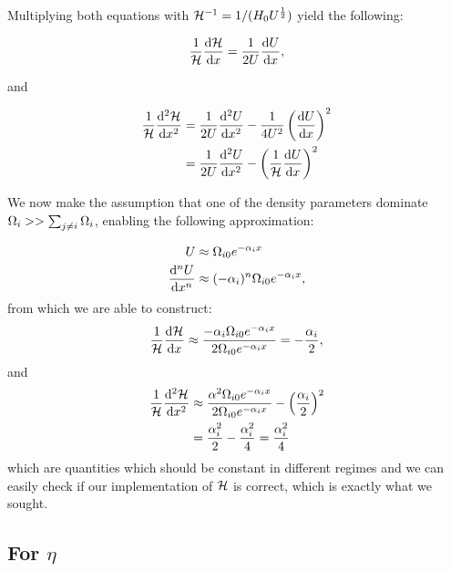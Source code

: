     Multiplying both equations with $\mathcal{H}^{-1} = 1/(H_0U^{\frac{1}{2}})$ yield the following:

    \begin{equation}
        \frac{1}{\mathcal{H}}\dv{\mathcal{H}}{x} = \frac{1}{2U}\dv{U}{x},
    \end{equation}

    and 

    \begin{equation}
        \begin{split}
            \frac{1}{\mathcal{H}}\dv[2]{\mathcal{H}}{x} &= \frac{1}{2U}\dv[2]{U}{x} - \frac{1}{4U^2}\left(\dv{U}{x}\right)^2 \\
            &= \frac{1}{2U}\dv[2]{U}{x}-\left(\frac{1}{\mathcal{H}}\dv{U}{x}\right)^2
        \end{split}
    \end{equation}

    We now make the assumption that one of the density parameters dominate $\Omega_i>> \sum_{j\neq i}\Omega_i$, enabling the following approximation:
    
    \begin{equation}
        \begin{split}
            U &\approx \Omega_{i0}e^{-\alpha_ix} \\
            \dv[n]{U}{x} &\approx (-\alpha_i)^n\Omega_{i0}e^{-\alpha_ix},
        \end{split}
    \end{equation}
    from which we are able to construct:
    \begin{equation}
        \frac{1}{\mathcal{H}}\dv{\mathcal{H}}{x} \approx \frac{-\alpha_i\Omega_{i0}e^{-\alpha_ix}}{2\Omega_{i0}e^{-\alpha_ix}} = -\frac{\alpha_i}{2},
    \end{equation}
    and
    \begin{equation}
        \begin{split}
            \frac{1}{\mathcal{H}}\dv[2]{\mathcal{H}}{x} &\approx \frac{\alpha^2\Omega_{i0}e^{-\alpha_ix}}{2\Omega_{i0}e^{-\alpha_ix}} - \left(\frac{\alpha_i}{2}\right)^2 \\
            &= \frac{\alpha_i^2}{2} - \frac{\alpha_i^2}{4} = \frac{\alpha_i^2}{4}
        \end{split}
    \end{equation}
    which are quantities which should be constant in different regimes and we can easily check if our implementation of $\mathcal{H}$ is correct, which is exactly what we sought. 

\subsection{For $\eta$}

